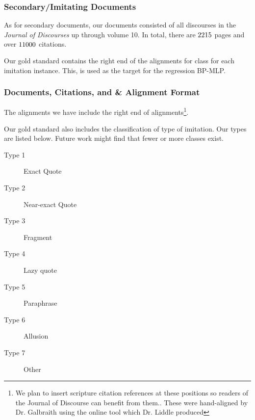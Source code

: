 \subsubsection{Secondary/Imitating Documents}
As for secondary documents, our documents consisted of all discourses in the \textit{Journal of Discourses} up through volume 10. In total, there are $2215$ pages and over $11000$ citations.

Our gold standard contains the right end of the alignments for class for each imitation instance. This, is used as the target for the regression BP-MLP. %


\subsubsection{Documents, Citations, and \& Alignment Format}
The alignments we have include the right end of alignments\footnote{We plan to insert scripture citation references at these positions so readers of the Journal of Discourse can benefit from them.. These were hand-aligned by Dr. Galbraith using the online tool which Dr. Liddle produced}.

Our gold standard also includes the classification of type of imitation. Our types are listed below. Future work might find that fewer or more classes exist.

	\begin{description}
		\item [Type 1] Exact Quote
		\item [Type 2] Near-exact Quote
		\item [Type 3] Fragment
		\item [Type 4] Lazy quote
		\item [Type 5] Paraphrase
		\item [Type 6] Allusion
		\item [Type 7] Other%
	\end{description}

